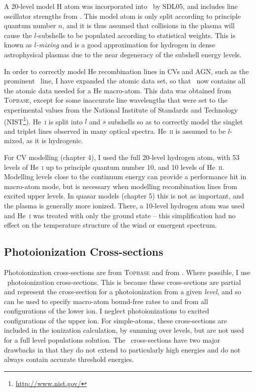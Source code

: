 A 20-level model H atom was incorporated into \py\ by SDL05,
and includes line oscillator strengths from \cite{menzel1935}.
This model atom is only split according to principle quantum number $n$,
and it is thus assumed that collisions in the plasma will cause 
the $l$-subshells to be populated according to statistical weights. 
This is known as {\em $l$-mixing} and is a good approximation for hydrogen in
dense astrophysical plasmas due to the near degeneracy of the subshell 
energy levels.

In order to correctly model He recombination lines in CVs and AGN, such as the 
prominent \heiiuv\ line, I have expanded the atomic data set, so that \py\
now contains all the atomic data needed for a He macro-atom. This data was 
obtained from \textsc{Topbase}, except for some inaccurate line wavelengths
that were set to the experimental values from the National 
Institute of Standards and Technology (NIST\footnote{\url{http://www.nist.gov/}}).
He~\textsc{i} is split into $l$ and $s$ subshells so as to correctly model the
singlet and triplet lines observed in many optical spectra. He~\textsc{ii} is assumed
to be $l$-mixed, as it is hydrogenic.

For CV modelling (chapter 4), I used the full 20-level hydrogen atom, with 53 levels of 
He~\textsc{i} up to principle quantum number 10, and 10 levels of He~\textsc{ii}. 
Modelling levels close to the continuum energy can
provide a performance hit in macro-atom mode, but is necessary
when modelling recombination lines from excited 
upper levels. In quasar models (chapter 5) 
this is not as important, and the
plasma is generally more ionized. There, a 10-level hydrogen atom was used and
He~\textsc{i} was treated with only the ground state -- this simplification
had no effect on the temperature structure of the wind or emergent spectrum.

\subsection{Photoionization Cross-sections}

Photoionization cross-sections are from \textsc{Topbase} \citep{cunto1993} and from 
\cite{vfky}. Where possible, I use \top\ photoionization cross-sections. This is because
these cross-sections are partial and represent the cross-section for a photoionization
from a given {\em level}, and so can be used to specify macro-atom 
bound-free rates to and from all configurations of the lower ion. 
I neglect photoionizations to excited configurations
of the upper ion. For simple-atoms, these cross-sections are included in the ionization
calculation, by summing over levels, but are not used for a full level populations solution.
The \top\ cross-sections have two major drawbacks in that they do not 
extend to particularly high energies and do not always contain accurate threshold
energies.

